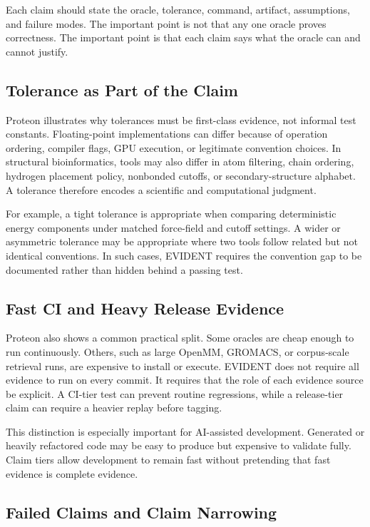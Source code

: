 \documentclass[10pt,twoside]{article}
\begin{document}
Each claim should state the oracle, tolerance, command, artifact, assumptions,
and failure modes. The important point is not that any one oracle proves
correctness. The important point is that each claim says what the oracle can and
cannot justify.

\subsection{Tolerance as Part of the Claim}

Proteon illustrates why tolerances must be first-class evidence, not informal
test constants. Floating-point implementations can differ because of operation
ordering, compiler flags, GPU execution, or legitimate convention choices. In
structural bioinformatics, tools may also differ in atom filtering, chain
ordering, hydrogen placement policy, nonbonded cutoffs, or secondary-structure
alphabet. A tolerance therefore encodes a scientific and computational
judgment.

For example, a tight tolerance is appropriate when comparing deterministic
energy components under matched force-field and cutoff settings. A wider or
asymmetric tolerance may be appropriate where two tools follow related but not
identical conventions. In such cases, EVIDENT requires the convention gap to be
documented rather than hidden behind a passing test.

\subsection{Fast CI and Heavy Release Evidence}

Proteon also shows a common practical split. Some oracles are cheap enough to
run continuously. Others, such as large OpenMM, GROMACS, or corpus-scale
retrieval runs, are expensive to install or execute. EVIDENT does not require
all evidence to run on every commit. It requires that the role of each evidence
source be explicit. A CI-tier test can prevent routine regressions, while a
release-tier claim can require a heavier replay before tagging.

This distinction is especially important for AI-assisted development. Generated
or heavily refactored code may be easy to produce but expensive to validate
fully. Claim tiers allow development to remain fast without pretending that
fast evidence is complete evidence.

\subsection{Failed Claims and Claim Narrowing}
\end{document}

